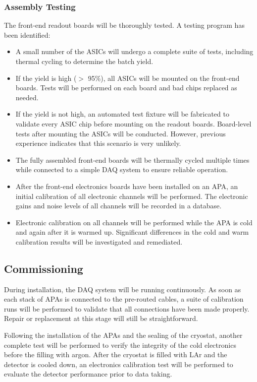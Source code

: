 \subsubsection{Assembly Testing}
\label{subsubsec:ce_install_assembly}

The front-end readout boards will be thoroughly tested. A testing program has been identified:
\begin{itemize}
\item A small number of the ASICs will undergo a complete suite 
of tests, including thermal cycling to determine the batch yield.
\item If the yield is high ($>$ 95\%), all ASICs will be mounted 
on the front-end boards.
Tests will be performed on each board and bad chips replaced as needed.
\item If the yield is not high, an automated test fixture will be 
fabricated to validate every ASIC chip before mounting on the readout boards.
Board-level tests after mounting the ASICs will be conducted.
However, previous experience indicates that this scenario is very unlikely.
\item The fully assembled front-end boards will be thermally cycled multiple times while connected
to a simple DAQ system to ensure reliable operation.
\item After the front-end electronics boards have been installed on an APA,
an initial calibration of all electronic channels will be performed.
The electronic gains and noise levels of all channels will be recorded in a database.
\item Electronic calibration on all channels will be performed while the APA is cold and again after it is warmed up.
Significant differences in the cold and warm calibration results will be investigated and remediated.  
\end{itemize}

%
\subsection{Commissioning } 
\label{subsec:ce_install_commission}

During installation, the DAQ system will be running continuously.
As soon as each stack of APAs is connected to the pre-routed cables, 
a suite of calibration runs will be performed to validate that all connections have been made properly.
Repair or replacement at this stage will still be straightforward.

Following the installation of the APAs and the sealing of the cryostat,
another complete test will be performed to verify the integrity of the cold electronics before the filling with argon.
After the cryostat is filled with LAr and the detector is cooled down,
an electronics calibration test will be performed to evaluate
the detector performance prior to data taking.

%



